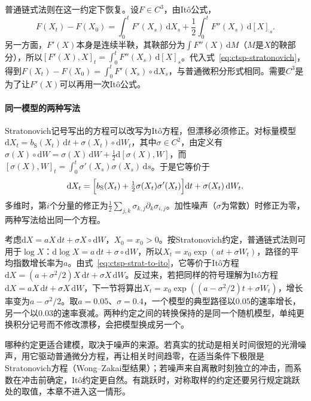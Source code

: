 普通链式法则在这一约定下恢复。设$F\in C^3$，由Itô公式，
\[
  F(X_t)-F(X_0)=\int_0^tF'(X_s)\,\mathrm dX_s+\frac12\int_0^tF''(X_s)\,\mathrm d[X]_s .
\]
另一方面，$F'(X)$本身是连续半鞅，其鞅部分为$\int F''(X)\,\mathrm dM$（$M$是$X$的鞅部分），所以$[F'(X),X]_t=\int_0^tF''(X_s)\,\mathrm d[X]_s$。代入式~\eqref{eq:ctsp-stratonovich}，得到$F(X_t)-F(X_0)=\int_0^tF'(X_s)\circ\mathrm dX_s$，与普通微积分形式相同。需要$C^3$是为了让$F'(X)$可以再用一次Itô公式。

\paragraph{同一模型的两种写法}
Stratonovich记号写出的方程可以改写为Itô方程，但漂移必须修正。对标量模型$\mathrm dX_t=b_{\mathrm S}(X_t)\,\mathrm dt+\sigma(X_t)\circ\mathrm dW_t$，其中$\sigma\in C^2$，由定义有$\sigma(X)\circ\mathrm dW=\sigma(X)\,\mathrm dW+\frac12\mathrm d[\sigma(X),W]$，而$[\sigma(X),W]_t=\int_0^t\sigma'(X_s)\sigma(X_s)\,\mathrm ds$。于是它等价于
\begin{equation}
  \mathrm dX_t=\Bigl[b_{\mathrm S}(X_t)+\tfrac12\sigma(X_t)\sigma'(X_t)\Bigr]\mathrm dt+\sigma(X_t)\,\mathrm dW_t .
  \label{eq:ctsp-strat-to-ito}
\end{equation}
多维时，第$i$个分量的修正为$\frac12\sum_{j,k}\sigma_{k,j}\partial_k\sigma_{i,j}$。加性噪声（$\sigma$为常数）时修正为零，两种写法给出同一个方程。

\begin{example}[乘性噪声的两种解读]
  \label{ex:ctsp-multiplicative-two-readings}
  考虑$\mathrm dX=aX\,\mathrm dt+\sigma X\circ\mathrm dW$，$X_0=x_0>0$。按Stratonovich约定，普通链式法则可用于$\log X$：$\mathrm d\log X=a\,\mathrm dt+\sigma\circ\mathrm dW$，所以$X_t=x_0\exp(at+\sigma W_t)$，路径的平均指数增长率为$a$。由式~\eqref{eq:ctsp-strat-to-ito}，它等价于Itô方程$\mathrm dX=(a+\sigma^2/2)X\,\mathrm dt+\sigma X\,\mathrm dW$。反过来，若把同样的符号理解为Itô方程$\mathrm dX=aX\,\mathrm dt+\sigma X\,\mathrm dW$，下一节将算出$X_t=x_0\exp((a-\sigma^2/2)t+\sigma W_t)$，增长率变为$a-\sigma^2/2$。取$a=0.05$、$\sigma=0.4$，一个模型的典型路径以$0.05$的速率增长，另一个以$0.03$的速率衰减。两种约定之间的转换保持的是同一个随机模型，单纯更换积分记号而不修改漂移，会把模型换成另一个。
\end{example}

哪种约定更适合建模，取决于噪声的来源。若真实的扰动是相关时间很短的光滑噪声，用它驱动普通微分方程，再让相关时间趋零，在适当条件下极限是Stratonovich方程（Wong--Zakai型结果）；若噪声来自离散时刻独立的冲击，而系数在冲击前确定，Itô约定更自然。有跳跃时，对称取样的约定还要另行规定跳跃处的取值，本章不进入这一情形。

